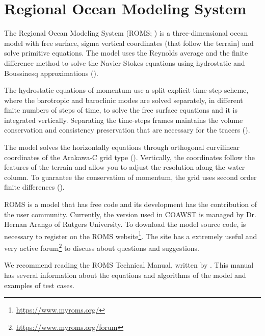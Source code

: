 
\section{Regional Ocean Modeling System}\label{romssecao}
\bigskip
\noindent The Regional Ocean Modeling System (ROMS; \cite{Shchepetkin2005}) is a three-dimensional ocean model with free surface, sigma vertical coordinates 
(that follow the terrain) and solve primitive equations. The model uses the Reynolds average and the finite difference method to 
solve the Navier-Stokes equations using hydrostatic and Boussinesq approximations (\cite{Haidvogel2008}).
\bigskip

\noindent The hydrostatic equations of momentum use a split-explicit time-step scheme, where the barotropic and baroclinic modes are solved separately, in
different finite numbers of steps of time, to solve the free surface equations and it is integrated vertically. Separating the time-steps frames maintains 
the volume conservation and consistency preservation that are necessary for the tracers (\cite{Shchepetkin2005, Haidvogel2008}).
\bigskip

\noindent The model solves the horizontally equations through orthogonal curvilinear coordinates of the Arakawa-C grid type (\cite{Arakawa1977}). Vertically, the 
coordinates follow the features of the terrain and allow you to adjust the resolution along the water column. To guarantee the conservation of momentum, the grid uses
second order finite differences (\cite{Haidvogel2008}).
\bigskip

\noindent ROMS is a model that has free code and its development has the contribution of the user community. Currently, the version used in COAWST is managed by Dr.
Hernan Arango of Rutgers University. To download the model source code, is necessary to register on the
ROMS website\textcolor{bleu_cite}{\textit{}\footnote{\textcolor{bleu_cite}{\href{https://www.myroms.org/}{https://www.myroms.org/}}}}. 
The site has a extremely useful and very active forum\textcolor{bleu_cite}{\textit{}\footnote{\textcolor{bleu_cite}{\href{https://www.myroms.org/forum}{https://www.myroms.org/forum}}}} 
to discuss about questions and suggestions.
\bigskip

\begin{tcolorbox}[enhanced,
    grow to left by   = 0cm,
    grow to right by  = 0cm,
    enlarge top by    = 0cm,
    enlarge bottom by = 0cm,
    tcbox raise base,
    boxrule           = 1.0pt,
    left              = 18mm,
    colframe          = green!50!black,coltext=green!25!black,colback=green!10!white,
    overlay           = {\begin{tcbclipinterior}\fill[green!75!blue!50!white] (frame.south west)
      rectangle node[text=white,font=\sffamily\bfseries\footnotesize,rotate=0] {NOTE} ([xshift=18mm]frame.north west);\end{tcbclipinterior}}]
      We recommend reading the ROMS Technical Manual, written by \textcite{hedstrom2018}. This manual has several
      information about the equations and algorithms of the model and examples of test cases.
  \end{tcolorbox}
\bigskip

